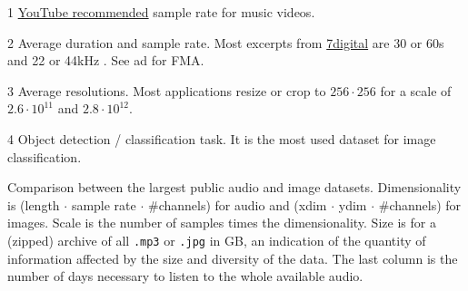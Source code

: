 \documentclass{article}
\newcommand{\todo}[1]{{\color{red} #1 }}
\begin{document}
\begin{table}[t]
\begin{threeparttable}
\begin{tablenotes}
		\item[1] \href{https://support.google.com/youtube/answer/6039860}{YouTube recommended} sample rate for music videos.
		\item[2] Average duration and sample rate. Most excerpts from \href{https://www.7digital.com}{7digital} are 30 or 60s and 22 or 44kHz \cite{msd_features}. See \todo{ad} for FMA.
		\item[3] Average resolutions. Most applications resize or crop to $256\cdot256$ for a scale of $2.6\cdot10^{11}$ and $2.8\cdot10^{12}$.
		\item[4] Object detection / classification task. It is the most used dataset for image classification.
	\end{tablenotes}
	\end{threeparttable}
	\caption{Comparison between the largest public audio and image datasets. Dimensionality is (length $\cdot$ sample rate $\cdot$ \#channels) for audio and (xdim $\cdot$ ydim $\cdot$ \#channels) for images. Scale is the number of samples times the dimensionality. Size is for a (zipped) archive of all \texttt{.mp3} or \texttt{.jpg} in GB, an indication of the quantity of information affected by the size and diversity of the data. The last column is the number of days necessary to listen to the whole available audio.}
	\label{tab:size}
\end{table}

\end{document}
